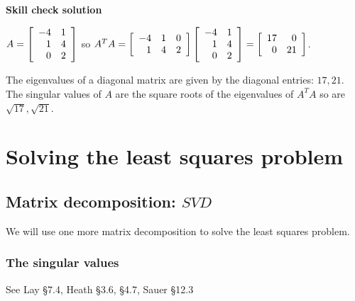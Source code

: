 \documentclass[12pt,letterpaper,noanswers]{exam}
\begin{document}
\noindent \textbf{Skill check solution}
\begin{questions}
\item $A = \left[\begin{array}{r r}
-4 & 1 \\
1 & 4 \\
0 & 2
\end{array}\right]$ so $A^TA = \left[\begin{array}{r r r}
-4 & 1 & 0 \\
1 & 4 & 2
\end{array}\right]\left[\begin{array}{r r}
-4 & 1 \\
1 & 4 \\
0 & 2
\end{array}\right] = \left[\begin{array}{r r}
17 & 0 \\
0 & 21
\end{array}\right]$.

The eigenvalues of a diagonal matrix are given by the diagonal entries: $17, 21$.  The singular values of $A$ are the square roots of the eigenvalues of $A^TA$ so are $\sqrt{17}, \sqrt{21}$.

\end{questions}

\section{Solving the least squares problem}

\subsection{Matrix decomposition: $SVD$}

We will use one more matrix decomposition to solve the least squares problem.

\subsubsection{The singular values}
See Lay \S 7.4, Heath \S 3.6, \S 4.7, Sauer \S 12.3
\end{document}
